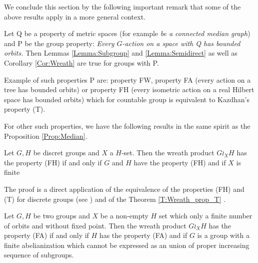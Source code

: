 We conclude this section by the following important remark that some of the above results apply in a more general context.
\begin{rem}
Let Q be a property of metric spaces (for example \emph{be a connected median graph}) and P be the group property: \emph{Every $G$-action on a space with Q has bounded orbits.}
Then Lemmas \ref{Lemma:Subgroup} and \ref{Lemma:Semidirect} as well as Corollary \ref{Cor:Wreath} are true for groups with P.

Example of such properties P are: property FW, property FA (every action on a tree has bounded orbits) or property FH (every isometric action on a real Hilbert space has bounded orbits) which for countable group is equivalent to Kazdhan's property (T).
\end{rem}
For other such properties, we have the following results in the same spirit as the Proposition \ref{Prop:Median}.
\begin{prop}
Let $G,H$ be discret groups and $X$ a $H$-set. Then the wreath product $G \wr_X H$ has the property (FH) if and only if $G$ and $H$ have the property (FH) and if $X$ is finite
\end{prop}
The proof is a direct application of the equivalence of the properties (FH) and (T) for discrete groups (see \cite{Bekka2008}) and of the Theorem \ref{T:Wreath_prop_T} .
%
\begin{thm}
Let $G,H$ be two groups and $X$ be a non-empty $H$ set which only a finite number of orbits and without fixed point. Then the wreath product $G \wr_X H$ has the property (FA) if and only if $H$ has the property (FA) and if $G$ is a group with a finite abelianization which cannot be expressed as an union of proper increasing sequence of subgroups.
\end{thm}

